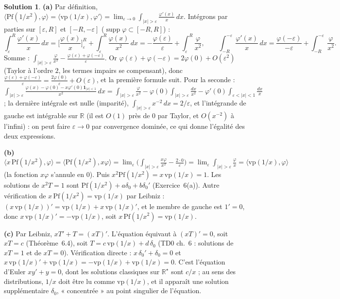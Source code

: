 \documentclass[11pt,a4paper]{article}
\newcommand{\R}{\mathbb{R}}
\DeclareMathOperator{\supp}{supp}
\theoremstyle{definition}
\newtheorem*{solution}{Solution}
\begin{document}
\begin{solution}
\noindent\textbf{(a)} Par définition, $\langle\mathrm{Pf}(1/x^2),\varphi\rangle=\langle\mathrm{vp}(1/x),\varphi'\rangle=\lim_{\varepsilon\to0}\int_{|x|>\varepsilon}\frac{\varphi'(x)}x\,dx$. Intégrons par parties sur $[\varepsilon,R]$ et $[-R,-\varepsilon]$ ($\supp\varphi\subset[-R,R]$) :
\[
\int_\varepsilon^R\frac{\varphi'(x)}x\,dx=\Big[\frac{\varphi(x)}x\Big]_\varepsilon^R+\int_\varepsilon^R\frac{\varphi(x)}{x^2}\,dx=-\frac{\varphi(\varepsilon)}\varepsilon+\int_\varepsilon^R\frac{\varphi}{x^2},\qquad
\int_{-R}^{-\varepsilon}\frac{\varphi'(x)}x\,dx=\frac{\varphi(-\varepsilon)}{-\varepsilon}+\int_{-R}^{-\varepsilon}\frac\varphi{x^2}.
\]
Somme : $\int_{|x|>\varepsilon}\frac\varphi{x^2}-\frac{\varphi(\varepsilon)+\varphi(-\varepsilon)}\varepsilon$. Or $\varphi(\varepsilon)+\varphi(-\varepsilon)=2\varphi(0)+O(\varepsilon^2)$ (Taylor à l'ordre $2$, les termes impairs se compensant), donc $\frac{\varphi(\varepsilon)+\varphi(-\varepsilon)}\varepsilon=\frac{2\varphi(0)}\varepsilon+O(\varepsilon)$, et la première formule suit. Pour la seconde : $\int_{|x|>\varepsilon}\frac{\varphi(x)-\varphi(0)-x\varphi'(0)\mathbf 1_{|x|<1}}{x^2}\,dx=\int_{|x|>\varepsilon}\frac\varphi{x^2}-\varphi(0)\int_{|x|>\varepsilon}\frac{dx}{x^2}-\varphi'(0)\int_{\varepsilon<|x|<1}\frac{dx}x$ ; la dernière intégrale est nulle (imparité), $\int_{|x|>\varepsilon}x^{-2}\,dx=2/\varepsilon$, et l'intégrande de gauche est intégrable sur $\R$ (il est $O(1)$ près de $0$ par Taylor, et $O(x^{-2})$ à l'infini) : on peut faire $\varepsilon\to0$ par convergence dominée, ce qui donne l'égalité des deux expressions.

\medskip
\noindent\textbf{(b)} $\langle x\,\mathrm{Pf}(1/x^2),\varphi\rangle=\langle\mathrm{Pf}(1/x^2),x\varphi\rangle=\lim_\varepsilon\big(\int_{|x|>\varepsilon}\frac{x\varphi}{x^2}-\frac{2\cdot0}\varepsilon\big)=\lim_\varepsilon\int_{|x|>\varepsilon}\frac\varphi x=\langle\mathrm{vp}(1/x),\varphi\rangle$ (la fonction $x\varphi$ s'annule en $0$). Puis $x^2\mathrm{Pf}(1/x^2)=x\,\mathrm{vp}(1/x)=1$. Les solutions de $x^2T=1$ sont $\mathrm{Pf}(1/x^2)+a\delta_0+b\delta_0'$ (Exercice~6(a)). Autre vérification de $x\,\mathrm{Pf}(1/x^2)=\mathrm{vp}(1/x)$ par Leibniz : $(x\,\mathrm{vp}(1/x))'=\mathrm{vp}(1/x)+x\,\mathrm{vp}(1/x)'$, et le membre de gauche est $1'=0$, donc $x\,\mathrm{vp}(1/x)'=-\mathrm{vp}(1/x)$, soit $x\,\mathrm{Pf}(1/x^2)=\mathrm{vp}(1/x)$.

\medskip
\noindent\textbf{(c)} Par Leibniz, $xT'+T=(xT)'$. L'équation équivaut à $(xT)'=0$, soit $xT=c$ (Théorème~6.4), soit $T=c\,\mathrm{vp}(1/x)+d\,\delta_0$ (TD0 ch.~6 : solutions de $xT=1$ et de $xT=0$). Vérification directe : $x\,\delta_0'+\delta_0=0$ et $x\,\mathrm{vp}(1/x)'+\mathrm{vp}(1/x)=-\mathrm{vp}(1/x)+\mathrm{vp}(1/x)=0$. C'est l'équation d'Euler $xy'+y=0$, dont les solutions classiques sur $\R^\star$ sont $c/x$ ; au sens des distributions, $1/x$ doit être lu comme $\mathrm{vp}(1/x)$, et il apparaît une solution supplémentaire $\delta_0$, « concentrée » au point singulier de l'équation.


\end{solution}
\end{document}

